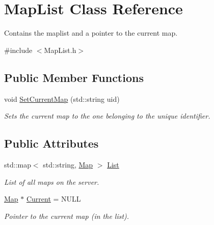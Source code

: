 \hypertarget{classMapList}{\section{Map\-List Class Reference}
\label{classMapList}
}


Contains the maplist and a pointer to the current map.  




{\ttfamily \#include $<$Map\-List.\-h$>$}

\subsection*{Public Member Functions}
\begin{DoxyCompactItemize}
\item 
void \hyperlink{classMapList_a8202d99b60adc444fb42f0ce2d2b3dbd}{Set\-Current\-Map} (std\-::string uid)
\begin{DoxyCompactList}\small\item\em Sets the current map to the one belonging to the unique identifier. \end{DoxyCompactList}\end{DoxyCompactItemize}
\subsection*{Public Attributes}
\begin{DoxyCompactItemize}
\item 
\hypertarget{classMapList_a02d028e30cdaf96170b885237b34990c}{std\-::map$<$ std\-::string, \hyperlink{structMap}{Map} $>$ \hyperlink{classMapList_a02d028e30cdaf96170b885237b34990c}{List}}\label{classMapList_a02d028e30cdaf96170b885237b34990c}

\begin{DoxyCompactList}\small\item\em List of all maps on the server. \end{DoxyCompactList}\item 
\hypertarget{classMapList_a9ff0021f3b08091091e58d3109c41400}{\hyperlink{structMap}{Map} $\ast$ \hyperlink{classMapList_a9ff0021f3b08091091e58d3109c41400}{Current} = N\-U\-L\-L}\label{classMapList_a9ff0021f3b08091091e58d3109c41400}

\begin{DoxyCompactList}\small\item\em Pointer to the current map (in the list). \end{DoxyCompactList}\end{DoxyCompactItemize}


